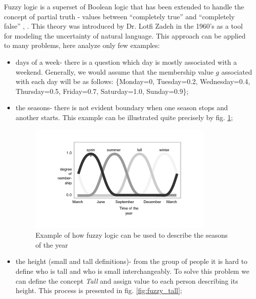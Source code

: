Fuzzy logic is a superset of Boolean logic that 
has been extended to handle the concept of partial truth - values between ``completely 
true'' and ``completely false'' \cite{bib6}, \cite{bib12}. This theory was introduced by 
Dr. Lotfi Zadeh in the 1960's as a tool for modeling the uncertainty of natural language. 
This approach can be applied to many problems, here analyze only few examples:
\begin{itemize}
    \item days of a week- there is a question which day is mostly associated
        with a weekend. Generally, we would assume that the membership value
        $g$ associated with each day will be as follows:
        \{Monday=0, Tuesday=0.2, Wednesday=0.4, Thursday=0.5, Friday=0.7,
        Saturday=1.0, Sunday=0.9\};
    \item the seasons- there is not evident boundary when one season stops and
        another starts. This example can be illustrated quite precisely by fig.
        \ref{fig:seasons};
        \begin{figure}[H]
            \begin{center}
                \includegraphics{fig/seasons.png}
            \end{center}
            \caption{Example of how fuzzy logic can be used to describe the
            seasons of the year\footnotemark}
            \label{fig:seasons}
        \end{figure}
    \item the height (small and tall definitions)- from the group of people it
        is hard to define who is tall and who is small interchangeably. To
        solve this problem we can define the concept \textit{Tall} and assign
        value to each person describing its height. This process is presented in
        fig. \ref{fig:fuzzy_tall};
        \begin{figure}[H]
            \begin{center}

\end{center}
\end{figure}
\end{itemize}
